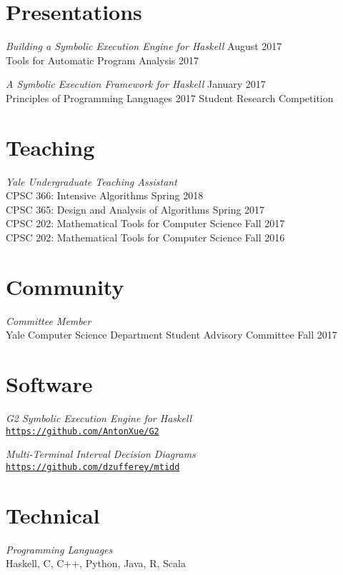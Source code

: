\documentclass[margin]{res}
\begin{document}
\begin{resume}
\section{Presentations}
\textit{Building a Symbolic Execution Engine for Haskell}
  \hfill August 2017 \\
Tools for Automatic Program Analysis 2017

\textit{A Symbolic Execution Framework for Haskell}
  \hfill January 2017 \\
Principles of Programming Languages 2017 Student Research Competition

\section{Teaching}
\textit{Yale Undergraduate Teaching Assistant} \\
  CPSC 366: Intensive Algorithms
    \hfill Spring 2018 \\
  CPSC 365: Design and Analysis of Algorithms
    \hfill Spring 2017 \\
  CPSC 202: Mathematical Tools for Computer Science
    \hfill Fall 2017 \\
  CPSC 202: Mathematical Tools for Computer Science
    \hfill Fall 2016

\section{Community}
\textit{Committee Member} \\
Yale Computer Science Department Student Advisory Committee
  \hfill Fall 2017

\section{Software}
\textit{G2 Symbolic Execution Engine for Haskell} \\
\href{https://github.com/AntonXue/G2}
     {\texttt{https://github.com/AntonXue/G2}}

\textit{Multi-Terminal Interval Decision Diagrams} \\
\href{https://github.com/dzufferey/mtidd}
     {\texttt{https://github.com/dzufferey/mtidd}}

\section{Technical}
\textit{Programming Languages} \\
Haskell, C, C++, Python, Java, R, Scala
 


\end{resume}
\end{document}
